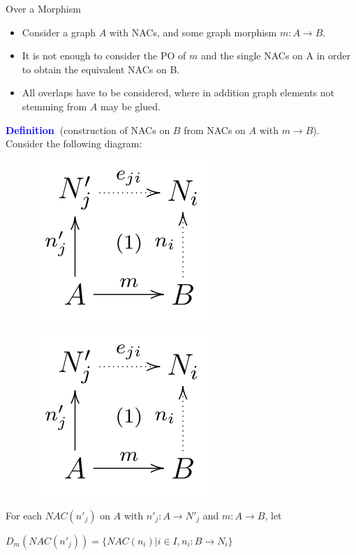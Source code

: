 \documentclass[xcolor=dvipsnames,pdf,10pt]{beamer}
\newcommand{\defn}{\textcolor{blue}{\textbf{\textrm{Definition\ }}}}
\begin{document}
\begin{frame}[allowframebreaks]{Over a Morphism}

\begin{itemize}
\item Consider a graph $A$ with NACs, and some graph morphism $m : A \rightarrow B$.
\item It is not enough to consider the PO of $m$ and the single NACs on A in order to obtain the equivalent NACs on B.
\item All overlaps have to be considered, where in addition graph elements not stemming from $A$ may be glued. 
\end{itemize}

\defn (construction of NACs on $B$ from NACs on $A$ with $m \rightarrow B$). Consider the following diagram: 

\begin{figure}[htbp]
\centering
\includegraphics[width=.4\textwidth]{fig/nac-shifted-over-morphism.png}
\label{fig:nac-shifted-over-morphism}
\end{figure}

\begin{figure}[htbp]
\centering
\includegraphics[width=.35\textwidth]{fig/nac-shifted-over-morphism.png}
\label{fig:nac-shifted-over-morphism}
\end{figure}

For each $NAC(n'_j)$ on $A$ with $n'_j : A \rightarrow N'_j$ and $m : A \rightarrow B$, let 

\begin{center}
$D_m(NAC(n'_j)) = \{ NAC(n_i)|i \in I, n_i : B \rightarrow N_i \}$
\end{center}


\end{frame}
\end{document}

